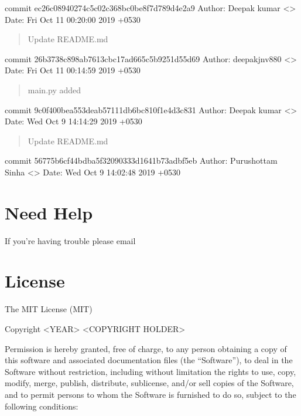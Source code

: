 \documentclass[letterpaper,10pt,english]{sphinxmanual}
\begin{document}
commit ec26c08940274c5c02c368bc0be8f7d789d4e2a9
Author: Deepak kumar \textless{}\textgreater{}
Date:   Fri Oct 11 00:20:00 2019 +0530
\begin{quote}

Update README.md
\end{quote}

commit 26b3738c898ab7613cbc17ad665c5b9251d55d69
Author: deepakjnv880 \textless{}\textgreater{}
Date:   Fri Oct 11 00:14:59 2019 +0530
\begin{quote}

main.py added
\end{quote}

commit 9c0f400bea553deab57111db6bc810f1e4d3c831
Author: Deepak kumar \textless{}\textgreater{}
Date:   Wed Oct 9 14:14:29 2019 +0530
\begin{quote}

Update README.md
\end{quote}

commit 56775b6cf44bdba5f32090333d1641b73adbf5eb
Author: Purushottam Sinha \textless{}\textgreater{}
Date:   Wed Oct 9 14:02:48 2019 +0530


\section{Need Help}
\label{\detokenize{help:need-help}}\label{\detokenize{help::doc}}
If you’re having trouble please email 


\section{License}
\label{\detokenize{license:license}}\label{\detokenize{license::doc}}
The MIT License (MIT)

Copyright \textless{}YEAR\textgreater{} \textless{}COPYRIGHT HOLDER\textgreater{}

Permission is hereby granted, free of charge, to any person obtaining a copy of this software and associated documentation files (the “Software”), to deal in the Software without restriction, including without limitation the rights to use, copy, modify, merge, publish, distribute, sublicense, and/or sell copies of the Software, and to permit persons to whom the Software is furnished to do so, subject to the following conditions:
\end{document}
